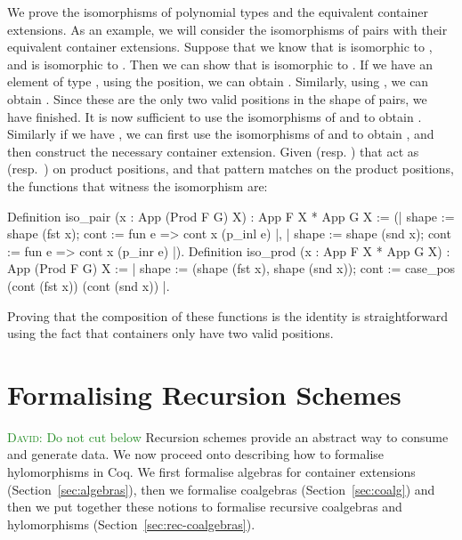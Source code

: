 \documentclass{llncs}
\newcommand{\dcas}[1]{\textcolor{ForestGreen}{\textsc{David}: #1}}
\begin{document}
We prove the isomorphisms of polynomial types and the equivalent 
container extensions. As an example, we will consider the isomorphisms
of pairs with their equivalent container extensions. Suppose that we
know that  is isomorphic to , and
 is isomorphic to . Then we can
show that  is isomorphic to
.  If we have an element of type 
,
using the  position, we can obtain
.  Similarly, using , we can
obtain . Since these are the only two valid positions
in the shape of pairs, we have finished. It is now sufficient to use the
isomorphisms of  and  to
obtain . Similarly if we have ,
we can first use the isomorphisms of 
 and
 to obtain
, and then construct the necessary container
extension. Given  (resp. ) that
act as  (resp.\ ) on product positions, and
 that pattern
matches on the product positions, the functions that witness the isomorphism
are:
\begin{coqcode}
Definition iso_pair (x : App (Prod F G) X) : App F X * App G X :=
  ({| shape := shape (fst x); cont := fun e => cont x (p_inl e) |}, 
   {| shape := shape (snd x); cont := fun e => cont x (p_inr e) |}).
Definition iso_prod (x : App F X * App G X) : App (Prod F G) X :=
{| shape := (shape (fst x), shape (snd x));
   cont := case_pos (cont (fst x)) (cont (snd x)) |}.
\end{coqcode}

\noindent
Proving that the composition of these functions is the identity is
straightforward using the fact that  containers only have two valid
positions.

\section{Formalising Recursion Schemes}
\label{sec:recursion-schemes}
\dcas{Do not cut below}
Recursion schemes provide an abstract way to consume and generate data. We now
proceed onto describing how to formalise hylomorphisms in Coq. We first
formalise algebras for container extensions (Section~\ref{sec:algebras}), then
we formalise coalgebras (Section~\ref{sec:coalg}) and then we put together
these notions to formalise recursive coalgebras and hylomorphisms
(Section~\ref{sec:rec-coalgebras}).
\end{document}
